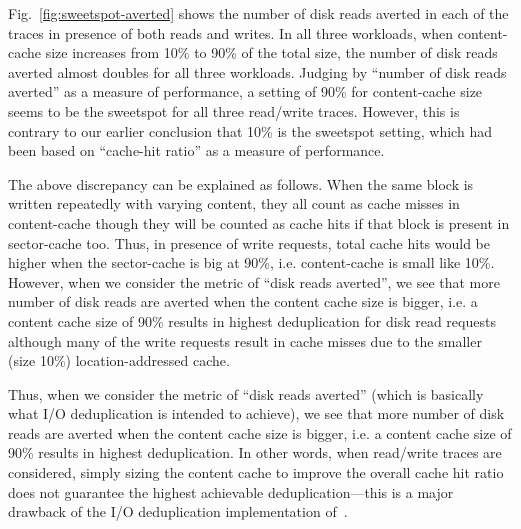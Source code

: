 Fig.~\ref{fig:sweetspot-averted} shows the number of disk reads averted
in each of the traces in presence of both reads and writes.
In all three workloads, when content-cache size increases from 10\% to
90\% of the total size, the number of disk reads averted almost doubles
for all three workloads.
Judging by ``number of disk reads averted'' as a measure of performance,
a setting of 90\% for content-cache size seems to be the sweetspot
for all three read/write traces. However, this is contrary to our earlier
conclusion that 10\% is the sweetspot setting, which had been based
on ``cache-hit ratio'' as a measure of performance.

The above discrepancy can be explained as follows. When the same block
is written repeatedly with varying content, they all count as cache misses
in content-cache though they will be counted as cache hits if that
block is present in sector-cache too. Thus, in presence of write
requests, total cache hits would be higher when the sector-cache is big
at 90\%, i.e. content-cache is small like 10\%. However, when we
consider the metric of ``disk reads averted'', we see that more number
of disk reads are averted when the content cache size is
bigger, i.e. a content cache size of 90\% results in highest deduplication
for disk read requests although many of the write requests result in cache 
misses due to the smaller (size 10\%) location-addressed cache.

Thus, when we consider the metric of ``disk reads averted'' (which is
basically what I/O deduplication is intended to achieve), we see that
more number of disk reads are averted when the content cache size is
bigger, i.e. a content cache size of 90\% results in highest deduplication.
In other words, when read/write traces are considered, simply sizing the
content cache to improve the overall cache hit ratio does not guarantee the
highest achievable deduplication---this is a major drawback of the
I/O deduplication implementation of~\cite{iodedup}.


